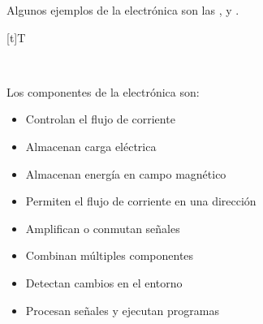 \documentclass[letterpaper,10pt,spanish]{sphinxmanual}
\let\sphinxpxdimen\pdfpxdimen\else\newdimen\sphinxpxdimen
\begin{document}
\sphinxAtStartPar
Algunos ejemplos de la electrónica son las ,  y .


\begin{savenotes}\sphinxattablestart
\sphinxthistablewithglobalstyle
\centering
\begin{tabulary}{\linewidth}[t]{T}
\sphinxtoprule
\sphinxtableatstartofbodyhook

\begin{sphinxfigure-in-table}
\centering
\capstart
\noindent\sphinxincludegraphics[width=300\sphinxpxdimen]{{image042}.png}
\label{\detokenize{1_guias/10informatica/G1004:id4}}\end{sphinxfigure-in-table}\relax
\\
\sphinxbottomrule
\end{tabulary}
\sphinxtableafterendhook\par
\sphinxattableend\end{savenotes}

\sphinxAtStartPar
Los componentes de la electrónica son:
\begin{itemize}
\item {} 
\sphinxAtStartPar
{} Controlan el flujo de corriente

\item {} 
\sphinxAtStartPar
{} Almacenan carga eléctrica

\item {} 
\sphinxAtStartPar
{} Almacenan energía en campo magnético

\item {} 
\sphinxAtStartPar
{} Permiten el flujo de corriente en una dirección

\item {} 
\sphinxAtStartPar
{} Amplifican o conmutan señales

\item {} 
\sphinxAtStartPar
{} Combinan múltiples componentes

\item {} 
\sphinxAtStartPar
{} Detectan cambios en el entorno

\item {} 
\sphinxAtStartPar
{} Procesan señales y ejecutan programas

\end{itemize}
\end{document}
